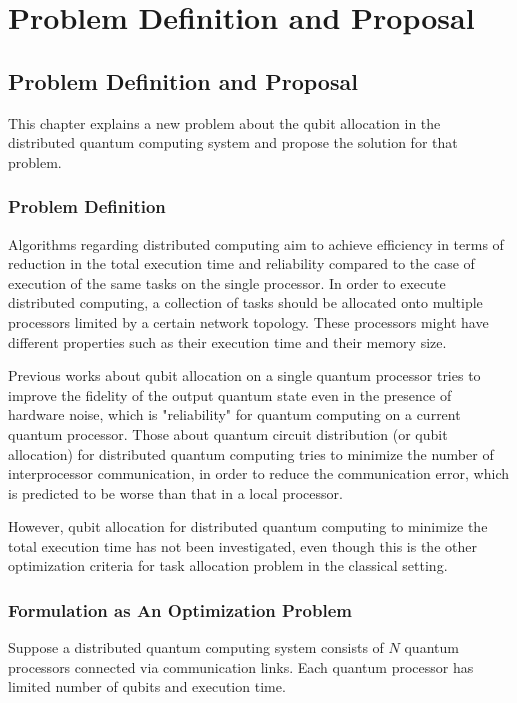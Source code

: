 \chapter{Problem Definition and Proposal}
\label{problem_definition_and_proposal}

\section{Problem Definition and Proposal}

This chapter explains a new problem about the qubit allocation in the \\ distributed quantum computing system and propose the solution for that problem.

\subsection{Problem Definition}

Algorithms regarding distributed computing aim to achieve efficiency in terms of reduction in the total execution time and reliability compared to the case of execution of the same tasks on the single processor. In order to execute distributed computing, a collection of tasks should be allocated onto multiple processors limited by a certain network topology.  These processors might have different properties such as their execution time and  their memory size. 

Previous works about qubit allocation on a single quantum processor tries to improve the fidelity of the output quantum state even in the presence of hardware noise, which is "reliability" for quantum computing on a current quantum processor.  Those about quantum circuit distribution (or qubit allocation) for distributed quantum computing tries to minimize the number of interprocessor communication, in order to reduce the  communication error, which is predicted to be worse than that in a local processor.

However, qubit allocation for distributed quantum computing to minimize the total execution time has not been investigated, even though this is the other optimization criteria for task allocation problem in the classical setting.

\subsection{Formulation as An Optimization Problem}

Suppose a distributed quantum computing system consists of $N$ quantum processors connected via communication links. Each quantum processor has limited number of qubits and execution time.

